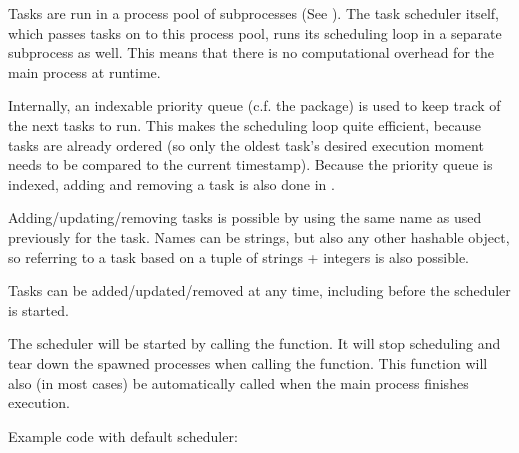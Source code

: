 \documentclass[letterpaper,10pt,english]{sphinxmanual}
\begin{document}
Tasks are run in a process pool of subprocesses (See ).
The task scheduler itself, which passes tasks on to this process pool, runs its scheduling loop in a separate subprocess as well.
This means that there is no computational overhead for the main process at runtime.

Internally, an indexable priority queue (c.f. the  package) is used to keep track of the next tasks to run.
This makes the scheduling loop quite efficient, because tasks are already ordered (so only the oldest task’s desired execution moment needs to be compared to the current timestamp).
Because the priority queue is indexed, adding and removing a task is also done in .

Adding/updating/removing tasks is possible by using the same name as used previously for the task.
Names can be strings, but also any other hashable object, so referring to a task based on a tuple of strings + integers is also possible.

Tasks can be added/updated/removed at any time, including before the scheduler is started.

The scheduler will be started by calling the  function. It will stop scheduling and tear down the spawned processes when calling the  function.
This function will also (in most cases) be automatically called when the main process finishes execution.

Example code with default scheduler:
\end{document}
